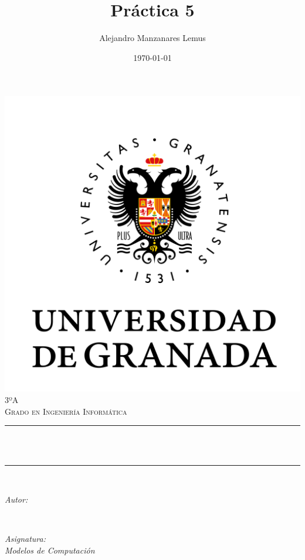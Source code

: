 \documentclass[12pt, spanish]{article}
\title{Práctica 5}
\author{Alejandro Manzanares Lemus }
\date{\today}
\makeatletter
\let\thetitle\@title
\let\theauthor\@author
\let\thedate\@date
\makeatother
\begin{document}
\begin{titlepage}
    \centering
    \vspace*{0.5 cm}
    \includegraphics[scale = 0.50]{UGR.png}\\[1.0 cm]
    \textsc{\large 3ºA}\\[0.5 cm]            
    \textsc{\large Grado en Ingeniería Informática}\\[0.5 cm]              
    \rule{\linewidth}{0.2 mm} \\[0.4 cm]
    { \huge \bfseries \thetitle}\\
    \rule{\linewidth}{0.2 mm} \\[1.5 cm]
    
    \begin{minipage}{0.4\textwidth}
        \begin{flushleft} \large
            \emph{Autor:}\\
            \theauthor
            \end{flushleft}
            \end{minipage}~
            \begin{minipage}{0.4\textwidth}
            \begin{flushright} \large
            \emph{Asignatura: \\
            Modelos de Computación}                   
        \end{flushright}
    \end{minipage}\\[1 cm]
  	
    {\large \thedate}\\[1 cm]
 	
    \vfill
    
\end{titlepage}
\pagebreak
\end{document}
